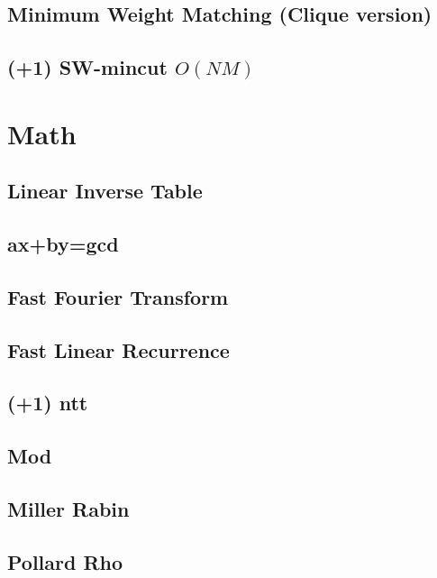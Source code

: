 \documentclass[a4paper,10pt,twocolumn,oneside]{article}
\begin{document}
\subsection{Minimum Weight Matching (Clique version)}

\subsection{(+1) SW-mincut $O(NM)$}


\section{Math}
\subsection{Linear Inverse Table}

\subsection{ax+by=gcd}

\subsection{Fast Fourier Transform}

\subsection{Fast Linear Recurrence}

\subsection{(+1) ntt}

\subsection{Mod}

\subsection{Miller Rabin}

\subsection{Pollard Rho}

\end{document}
